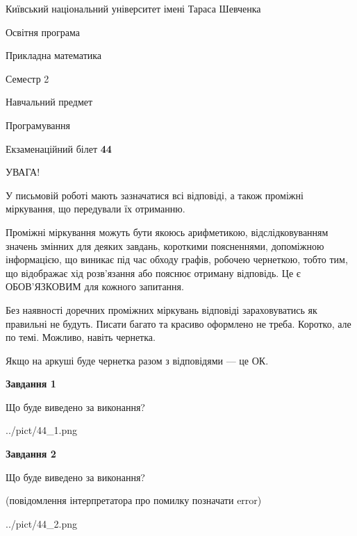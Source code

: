 \documentclass[12pt, ukrainian]{article}
\begin{document}
{{\begin {small}\par
{ \center  Київський національний університет імені Тараса Шевченка \par}
{\parbox {5 cm}{Освітня програма \hfill}{\parbox {7 cm}{Прикладна математика\hfill}}\parbox {6 cm}{\hfill Семестр 2}}\par
{\parbox {5 cm} {Навчальний предмет \hfill}\parbox {7 cm}{Програмування \hfill}\parbox {6cm}{\hfill}\par}\vspace{-7pt} \end{small}}{\center Екзаменаційний білет \No \textbf
{ 44 }\par}}
{
\begin {large}
УВАГА!

У письмовій роботі мають зазначатися всі відповіді, а також проміжні міркування, що передували їх отриманню.

Проміжні міркування можуть бути якоюсь арифметикою, відслідковуванням зна\-чень змінних для деяких завдань,
короткими поясненнями, допоміжною інформацією, що виникає під час обходу графів, робочею чернеткою,
тобто тим, що відображає хід розв’язання або пояснює отриману відповідь.
Це є ОБОВ’ЯЗКОВИМ для кожного запитання.

Без наявності доречних проміжних міркувань відповіді зараховуватись як правиль\-ні не будуть.
Писати багато та красиво оформлено не треба. Коротко, але по темі. Можли\-во, навіть чернетка.

Якщо на аркуші буде чернетка разом з відповідями --- це ОК.

\newpage

{\begin {center}\textbf{Завдання 1}\end {center}}\par
Що буде виведено за виконання?\par
\begin{center}
	{../pict/44_1.png}
\end{center}
\newpage

{\begin {center}\textbf{Завдання 2}\end {center}}\par
Що буде виведено за виконання?\par
 (повідомлення інтерпретатора про помилку позначати error)\par
\begin{center}
	{../pict/44_2.png}
\end{center}
\newpage


\end{large}}
\end{document}
